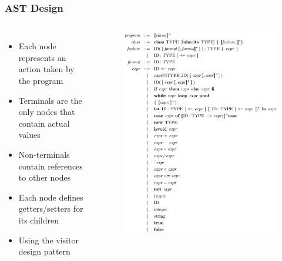 \documentclass{beamer}
\begin{document}
\begin{frame}
  \frametitle{AST Design}

  \begin{columns}
    \begin{itemize}
      \item Each node represents an action taken by the program
      \item Terminals are the only nodes that contain actual values
      \item Non-terminals contain references to other nodes
      \item Each node defines getters/setters for its children
      \item Using the visitor design pattern
    \end{itemize}

    \begin{figure}
      \centering
      \includegraphics[width=\linewidth]{img/hierarchy}
    \end{figure}
  \end{columns}
\end{frame}
\end{document}
